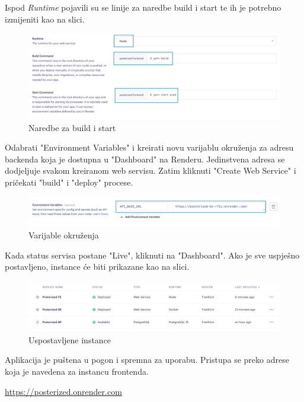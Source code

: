 			\pagebreak
			Ispod \textit{Runtime} pojavili su se linije za naredbe build i start te ih je potrebno izmijeniti kao na slici.
			\begin{figure}[H]
				\includegraphics[scale=0.3]{slike/deploy/frontend3.png} %
				\centering
				\caption{Naredbe za build i start}
				\label{fig:promjene}
			\end{figure}
			
			Odabrati "Environment Variables" i kreirati novu varijablu okruženja za adresu backenda koja je dostupna u "Dashboard" na Renderu. Jedinstvena adresa se dodjeljuje svakom kreiranom web servisu. Zatim kliknuti "Create Web Service" i pričekati "build" i "deploy" procese.
			\begin{figure}[H]
				\includegraphics[scale=0.3]{slike/deploy/frontend4.png} %
				\centering
				\caption{Varijable okruženja}
				\label{fig:promjene}
			\end{figure}
			
			Kada status servisa postane "Live", kliknuti na "Dashboard". Ako je sve uspješno postavljeno, instance će biti prikazane kao na slici.
			\begin{figure}[H]
				\includegraphics[scale=0.3]{slike/deploy/success.png} %
				\centering
				\caption{Uspostavljene instance}
				\label{fig:promjene}
			\end{figure} 
			
			Aplikacija je puštena u pogon i spremna za uporabu. Pristupa se preko adrese koja je navedena za instancu frontenda. 
			
			\href{https://posterized.onrender.com}{https://posterized.onrender.com}
			
			\eject 